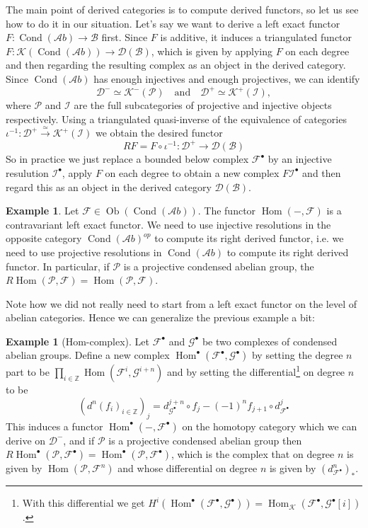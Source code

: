 \documentclass[11pt,A4]{article}
\theoremstyle{plain}
\theoremstyle{definition}
\newtheorem{exa}[thm]{Example}
\theoremstyle{remark}
\newcommand{\Z}{\mathbb{Z}}
\newcommand{\1}{\mathbbm{1}}
\newcommand{\F}{\mathcal{F}}
\newcommand{\G}{\mathcal{G}}
\newcommand{\calP}{\mathcal{P}}
\newcommand{\scrB}{\mathscr{B}}
\newcommand{\Ab}{\mathscr{A}b}
\newcommand{\D}{\mathscr{D}}
\newcommand{\K}{\mathscr{K}}
\DeclareMathOperator{\Hom}{Hom}
\DeclareMathOperator{\Cond}{Cond}
\DeclareMathOperator{\Ob}{Ob}
\newcommand{\grd}{^{\bullet}}
\begin{document}
The main point of derived categories is to compute derived functors, so let us see how to do it in our situation.
Let's say we want to derive a left exact functor $F\colon \Cond(\Ab)\to \scrB$ first.
Since $F$ is additive, it induces a triangulated functor $F\colon \K(\Cond(\Ab))\to \D(\scrB)$, which is given by applying $F$ on each degree and then regarding the resulting complex as an object in the derived category.
Since $\Cond(\Ab)$ has enough injectives and enough projectives, we can identify
\[ \D^{-}\simeq\K^{-}(\mathscr{P}) \quad \text{and} \quad \D^{+}\simeq\K^{+}(\mathscr{I}),\]
where $\mathscr{P}$ and $\mathscr{I}$ are the full subcategories of projective and injective objects respectively.
Using a triangulated quasi-inverse of the equivalence of categories $\iota^{-1}\colon \D^{+}\xrightarrow{\simeq}\K^{+}(\mathscr{I})$ we obtain the desired functor
\[ RF=F\circ \iota^{-1}\colon \D^{+}\to \D(\scrB) \]
So in practice we just replace a bounded below complex $\F\grd$ by an injective resulution $\mathcal{I}\grd$, apply $F$ on each degree to obtain a new complex $F\mathcal{I}\grd$ and then regard this as an object in the derived category $\D(\scrB)$.

\begin{exa}
    Let $\F\in\Ob(\Cond(\Ab))$.
    The functor $\Hom(-,\F)$ is a contravariant left exact functor.
    We need to use injective resolutions in the opposite category $\Cond(\Ab)^{op}$ to compute its right derived functor, i.e. we need to use projective resolutions in $\Cond(\Ab)$ to compute its right derived functor.
    In particular, if $\calP$ is a projective condensed abelian group, the $R\Hom(\calP,\F)=\Hom(\calP,\F)$.
\end{exa}

Note how we did not really need to start from a left exact functor on the level of abelian categories.
Hence we can generalize the previous example a bit:

\begin{exa}[Hom-complex]
    Let $\F\grd$ and $\G\grd$ be two complexes of condensed abelian groups.
    Define a new complex $\Hom\grd(\F\grd,\G\grd)$ by setting the degree $n$ part to be $\prod_{i\in \Z}\Hom(\F^{i},\G^{i+n})$ and by setting the differential\footnote{With this differential we get $H^{i}(\Hom\grd(\F\grd,\G\grd))=\Hom_{\K}(\F\grd,\G\grd[i])$.} on degree $n$ to be
    \[ (d^{n}(f_{i})_{i\in \Z})_{j}=d^{j+n}_{\G\grd}\circ f_{j}-(-1)^{n}f_{j+1}\circ d_{\F\grd}^{j} \]
    This induces a functor $\Hom\grd(-,\F\grd)$ on the homotopy category which we can derive on $\D^{-}$, and if $\calP$ is a projective condensed abelian group then $R\Hom\grd(\calP,\F\grd)=\Hom\grd(\calP,\F\grd)$, which is the complex that on degree $n$ is given by $\Hom(\calP,\F^{n})$ and whose differential on degree $n$ is given by $(d_{\F\grd}^{n})_{*}$.
\end{exa}
\end{document}
